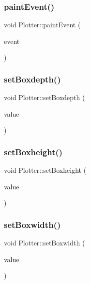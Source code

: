 \mbox{\label{class_plotter_a06477bf987646f000a8982db1352a11d}} 
\subsubsection{\texorpdfstring{paint\+Event()}{paintEvent()}}
{\footnotesize\ttfamily void Plotter\+::paint\+Event (\begin{DoxyParamCaption}\item[{Q\+Paint\+Event $\ast$}]{event }\end{DoxyParamCaption})}

\mbox{\label{class_plotter_aa599dcb990c94c5effa199d2696f3fba}} 
\subsubsection{\texorpdfstring{set\+Boxdepth()}{setBoxdepth()}}
{\footnotesize\ttfamily void Plotter\+::set\+Boxdepth (\begin{DoxyParamCaption}\item[{int}]{value }\end{DoxyParamCaption})}

\mbox{\label{class_plotter_a67bab31d1a00f883236ebb26df33a229}} 
\subsubsection{\texorpdfstring{set\+Boxheight()}{setBoxheight()}}
{\footnotesize\ttfamily void Plotter\+::set\+Boxheight (\begin{DoxyParamCaption}\item[{int}]{value }\end{DoxyParamCaption})}

\mbox{\label{class_plotter_a8c1b140601370f63bf0bcb0255979bd9}} 
\subsubsection{\texorpdfstring{set\+Boxwidth()}{setBoxwidth()}}
{\footnotesize\ttfamily void Plotter\+::set\+Boxwidth (\begin{DoxyParamCaption}\item[{int}]{value }\end{DoxyParamCaption})}

